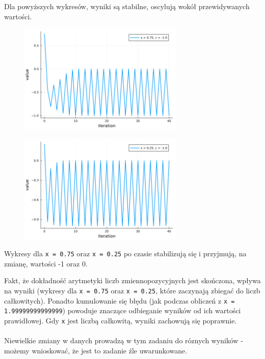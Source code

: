 \documentclass[15pt, a4paper]{article}
\begin{document}
\vspace{0.5cm}

\noindent Dla powyższych wykresów, wyniki są stabilne, oscylują wokół przewidywanych wartości.

\vspace{0.5cm}

\begin{figure}[h]
    \centering
    \includegraphics[width=0.7\textwidth]{img/6_6_plot.png}
\end{figure}

\begin{figure}[h]
    \centering
    \includegraphics[width=0.7\textwidth]{img/6_7_plot.png}
\end{figure}

\vspace{0.5cm}

\noindent Wykresy dla \verb|x = 0.75| oraz \verb|x = 0.25| po czasie stabilizują się i przyjmują, na zmianę, wartości -1 oraz 0.

\vspace{0.5cm}

\noindent Fakt, że dokładność arytmetyki liczb zmiennopozycyjnych jest skończona, wpływa na wyniki (wykresy dla \verb|x = 0.75| oraz \verb|x = 0.25|, które zaczynają zbiegać do liczb całkowitych).  Ponadto kumulowanie się błędu (jak podczas obliczeń z \verb|x = 1.99999999999999|) powoduje znaczące odbieganie wyników od ich wartości prawidłowej. Gdy \verb|x| jest liczbą całkowitą, wyniki zachowują się poprawnie.\\\\
Niewielkie zmiany w danych prowadzą w tym zadaniu do róznych wyników - możemy wnioskować, że jest to zadanie źle uwarunkowane.
\end{document}
